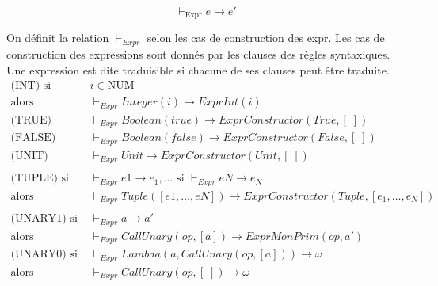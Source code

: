 \documentclass[
  12pt,
]{article}
\begin{document}
\[ \vdash_{\text{Expr}} e \rightarrow e' \]

On définit la relation \(\vdash_{Expr}\) selon les cas de construction
des expr. Les cas de construction des expressions sont donnés par les
clauses des règles syntaxiques. Une expression est dite traduisible si
chacune de ses clauses peut être traduite. \begin{align*}
  \text{(INT)} \text{ si }     & i  \in \text{NUM}                                                                                                       \\
  \text{alors}                 & \vdash_{Expr} Integer(i) \rightarrow  ExprInt(i)                                                                        \\
  \text{(TRUE)} \quad          & \vdash_{Expr} Boolean(true) \rightarrow  ExprConstructor(True,[\;])                                                     \\
  \text{(FALSE)} \quad         & \vdash_{Expr} Boolean(false) \rightarrow  ExprConstructor(False, [\;])                                                  \\
  \text{(UNIT)}\quad           & \vdash_{Expr} Unit \rightarrow  ExprConstructor(Unit, [\;])
  \\
  \\
  \text{(TUPLE)} \text{ si }   & \vdash_{Expr} e1 \rightarrow  e_1, \dots \text{ si }  \vdash_{Expr} eN \rightarrow  e_N                                 \\
  \text{alors}                 & \vdash_{Expr} Tuple([e1,\dots,eN]) \rightarrow  ExprConstructor(Tuple, [e_1,\dots,e_N])
  \\
  \\
  \text{(UNARY1)} \text{ si }  & \vdash_{Expr} a \rightarrow  a'                                                                                         \\
  \text{alors}                 & \vdash_{Expr} CallUnary(op, [a]) \rightarrow  ExprMonPrim(op, a')                                                       \\
  \text{(UNARY0)} \text{ si }  & \vdash_{Expr} Lambda(a,CallUnary(op, [a])) \rightarrow  \omega                                                          \\
  \text{alors}                 & \vdash_{Expr} CallUnary(op, [\;]) \rightarrow \omega                                                                    \\
  \\
  \\

\end{align*}
\end{document}
